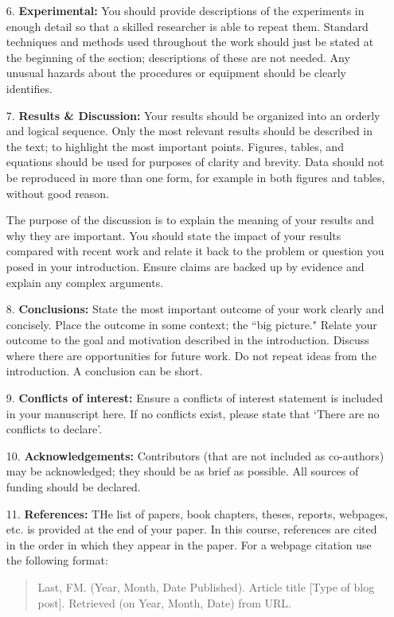 \begin{itemize}
    \item[6.] \textbf{Experimental:} You should provide descriptions of the experiments in enough detail so that a skilled researcher is able to repeat them. Standard techniques and methods used throughout the work should just be stated at the beginning of the section; descriptions of these are not needed. Any unusual hazards about the procedures or equipment should be clearly identifies.
    \item[7.] \textbf{Results \& Discussion:} Your results should be organized into an orderly and logical sequence. Only the most relevant results should be described in the text; to highlight the most important points. Figures, tables, and equations should be used for purposes of clarity and brevity. Data should not be reproduced in more than one form, for example in both figures and tables, without good reason. 

        The purpose of the discussion is to explain the meaning of your results and why they are important. You should state the impact of your results compared with recent work and relate it back to the problem or question you posed in your introduction. Ensure claims are backed up by evidence and explain any complex arguments.
    \item[8.] \textbf{Conclusions:} State the most important outcome of your work clearly and concisely. Place the outcome in some context; the ``big picture." Relate your outcome to the goal and motivation described in the introduction. Discuss where there are opportunities for future work. Do not repeat ideas from the introduction. A conclusion can be short.
    \item[9.] \textbf{Conflicts of interest:} Ensure a conflicts of interest statement is included in your manuscript here. If no conflicts exist, please state that `There are no conflicts to declare'. 
    \item[10.] \textbf{Acknowledgements:} Contributors (that are not included as co-authors) may be acknowledged; they should be as brief as possible. All sources of funding should be declared.
    \item[11.] \textbf{References:} THe list of papers, book chapters, theses, reports, webpages, etc. is provided at the end of your paper. In this course, references are cited in the order in which they appear in the paper. For a webpage citation use the following format:
        \begin{quotation}
            Last, FM. (Year, Month, Date Published). Article title [Type of blog post]. Retrieved (on Year, Month, Date) from URL.
        \end{quotation}
\end{itemize}


